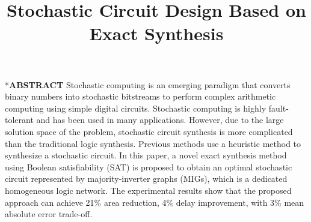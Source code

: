 \documentclass[conference,letterpaper]{IEEEtran}
\makeatletter
\renewcommand{\section}{\@startsection{section}{1}{0mm}
    {-\baselineskip}{0.001\baselineskip}{\bf\leftline}}
\makeatother
\begin{document}
\title{ \Large\textbf{ Stochastic Circuit Design Based on Exact Synthesis}\vspace{-1.2em} }
\author{
}

\maketitle
\section*{\textbf{\large ABSTRACT}}
Stochastic computing is an emerging paradigm that converts binary numbers into stochastic bitstreams to perform complex arithmetic computing using simple digital circuits. 
Stochastic computing is highly fault-tolerant and has been used in many applications. 
However, due to the large solution space of the problem, stochastic circuit synthesis is more complicated than the traditional logic synthesis.
Previous methods use a heuristic method to synthesize a stochastic circuit. In this paper, a novel exact synthesis method using Boolean satisfiability (SAT) is proposed to obtain an optimal stochastic circuit represented by majority-inverter graphs (MIGs), which is a dedicated homogeneous logic network. The experimental results show that the proposed approach can achieve 21\% area reduction, 4\% delay improvement, with 3\% mean absolute error trade-off.  
\vspace{2ex}

\end{document}
